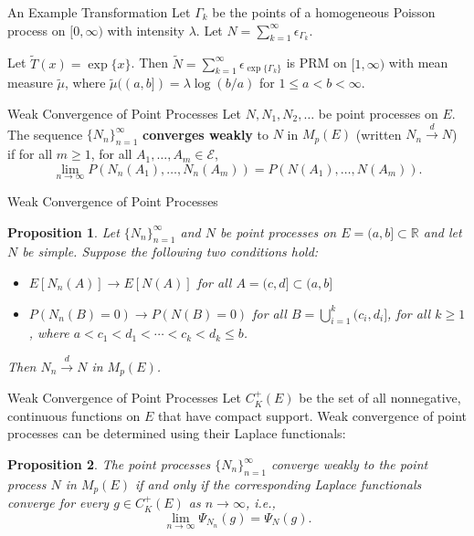 \documentclass{beamer}
\newtheorem{proposition}{Proposition}
\begin{document}
\begin{frame}{An Example Transformation}
    Let $\Gamma_k$ be the points of a homogeneous Poisson process on $[0, \infty)$ with intensity $\lambda$. Let $N = \sum_{k = 1}^{\infty} \epsilon_{\Gamma_k}$.

    \smallskip
    
    Let $\tilde{T}(x) = \exp\{x\}$. Then $\tilde{N} = \sum_{k = 1}^{\infty} \epsilon_{\exp\{\Gamma_k\}}$ is PRM on $[1, \infty)$ with mean measure $\tilde{\mu}$, where $\tilde{\mu}((a, b]) = \lambda\log(b / a)$ for $1 \le a < b < \infty$.
\end{frame}

\begin{frame}{Weak Convergence of Point Processes}
    Let $N, N_1, N_2, \ldots$ be point processes on $E$. The sequence $\{N_n\}_{n = 1}^{\infty}$ \textbf{converges weakly} to $N$ in $M_p(E)$ (written $N_n \xrightarrow{d} N$) if for all $m \ge 1$, for all $A_1, \ldots, A_m \in \mathcal{E}$,
    \[
    \lim_{n \to \infty} P(N_n(A_1), \ldots, N_n(A_m)) = P(N(A_1), \ldots, N(A_m)).
    \]
\end{frame}

\begin{frame}{Weak Convergence of Point Processes}
    \begin{proposition}
        Let $\{N_n\}_{n = 1}^{\infty}$ and $N$ be point processes on $E = (a, b] \subset \mathbb{R}$ and let $N$ be simple. Suppose the following two conditions hold:
        \begin{itemize}
            \item $E[N_n(A)] \to E[N(A)]$ for all $A = (c, d] \subset (a, b]$
            \item $P(N_n(B) = 0) \to P(N(B) = 0)$ for all $B = \bigcup_{i = 1}^k (c_i, d_i]$, for all $k \ge 1$, where $a < c_1 < d_1 < \cdots < c_k < d_k \le b$.
        \end{itemize}
        Then $N_n \xrightarrow{d} N$ in $M_p(E)$.
    \end{proposition}
\end{frame}

\begin{frame}{Weak Convergence of Point Processes}
    Let $C_K^+(E)$ be the set of all nonnegative, continuous functions on $E$ that have compact support. Weak convergence of point processes can be determined using their Laplace functionals:
    \begin{proposition}
        The point processes $\{N_n\}_{n = 1}^{\infty}$ converge weakly to the point process $N$ in $M_p(E)$ if and only if the corresponding Laplace functionals converge for every $g \in C_K^+(E)$ as $n \to \infty$, i.e.,
        \[
        \lim_{n \to \infty} \Psi_{N_n}(g) = \Psi_N(g).
        \]
    \end{proposition}
\end{frame}
\end{document}
